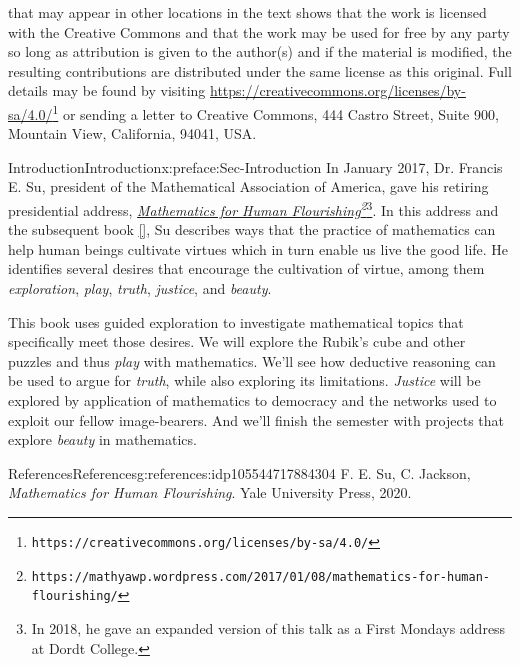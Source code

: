 \documentclass[oneside,10pt,]{book}
\newcommand{\xreffont}{\relax}
\numberwithin{equation}{section}
\begin{document}
 that may appear in other locations in the text shows that the work is licensed with the Creative Commons and that the work may be used for free by any party so long as attribution is given to the author(s) and if the material is modified, the resulting contributions are distributed under the same license as this original. Full details may be found by visiting \href{https://creativecommons.org/licenses/by-sa/4.0/}{https:\slash{}\slash{}creativecommons.org\slash{}licenses\slash{}by-sa\slash{}4.0\slash{}}\footnote{\nolinkurl{https://creativecommons.org/licenses/by-sa/4.0/}\label{g:fn:idp105544717910416}}  or sending a letter to Creative Commons, 444 Castro Street, Suite 900, Mountain View, California, 94041, USA.\par\medskip
{}
\null\clearpage
%
%
\typeout{************************************************}
\typeout{************************************************}
%
\begin{preface}{Introduction}{}{Introduction}{}{}{x:preface:Sec-Introduction}
In January 2017, Dr. Francis E. Su, president of the Mathematical Association of America, gave his retiring presidential address, \emph{\href{https://mathyawp.wordpress.com/2017/01/08/mathematics-for-human-flourishing/}{Mathematics for Human Flourishing}\footnote{\nolinkurl{https://mathyawp.wordpress.com/2017/01/08/mathematics-for-human-flourishing/}\label{g:fn:idp105544717912336}}}\footnote{In 2018, he gave an expanded version of this talk as a First Mondays address at Dordt College.\label{g:fn:idp105544717912592}}. In this address and the subsequent book \hyperlink{x:biblio:Su2020}{[{\xreffont 1}]}, Su describes ways that the practice of mathematics can help human beings cultivate virtues which in turn enable us live the good life. He identifies several desires that encourage the cultivation of virtue, among them \emph{exploration}, \emph{play}, \emph{truth}, \emph{justice}, and \emph{beauty}.%
\par
This book uses guided exploration to investigate mathematical topics that specifically meet those desires. We will explore the Rubik's cube and other puzzles and thus \emph{play} with mathematics. We'll see how deductive reasoning can be used to argue for \emph{truth}, while also exploring its limitations. \emph{Justice} will be explored by application of mathematics to democracy and the networks used to exploit our fellow image-bearers. And we'll finish the semester with projects that explore \emph{beauty} in mathematics.%
%
%
\typeout{************************************************}
\typeout{************************************************}
%
\begin{references-}{References}{}{References}{}{}{g:references:idp105544717884304}
F. E. Su, C. Jackson, \emph{Mathematics for Human Flourishing}. Yale University Press, 2020.\end{references-}
\end{preface}
\end{document}
